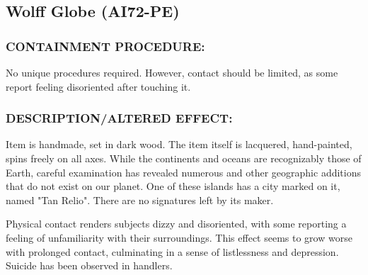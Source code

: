 \subsection*{Wolff Globe (AI72-PE)}
\subsubsection*{CONTAINMENT PROCEDURE:}
\par No unique procedures required.
However, contact should be limited, as
some report feeling disoriented after
touching it.
\subsubsection*{DESCRIPTION/ALTERED EFFECT:}
\par Item is handmade, set in dark wood. The
item itself is lacquered, hand-painted,
spins freely on all axes. While the continents and oceans are
recognizably those of Earth, careful examination has revealed
numerous  and other geographic
additions that do not exist on our planet. One of these islands has
a city marked on it, named "Tan Relio". There are no signatures
left by its maker.
\par Physical contact renders subjects dizzy and disoriented, with
some reporting a feeling of unfamiliarity with their surroundings.
This effect seems to grow worse with prolonged contact,
culminating in a sense of listlessness and depression. Suicide
has been observed in 
handlers.